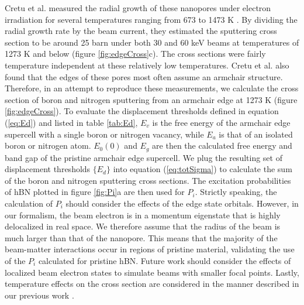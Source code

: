 \documentclass{article}
\begin{document}
Cretu et al. measured the radial growth of these nanopores under electron
irradiation for several temperatures ranging from 673 to 1473 K
\cite{Cretu2015}.
By dividing the radial growth rate by the beam current, they estimated the
sputtering cross section to be around 25 barn under both 30 and 60 keV beams at
temperatures of 1273 K and below (figure \ref{fig:edgeCross}c).
The cross sections were fairly temperature independent at these relatively low
temperatures.
Cretu et al. also found that the edges of these pores most often assume an
armchair structure.
Therefore, in an attempt to reproduce these measurements, we calculate the
cross section of boron and nitrogen sputtering from an armchair edge at 1273 K
(figure \ref{fig:edgeCross}).
To evaluate the displacement thresholds defined in equation (\ref{eq:Ed}) and
listed in table \ref{tab:Ed}, $E_v$ is the free energy of the armchair edge
supercell with a single boron or nitrogen vacancy, while $E_a$ is that of an
isolated boron or nitrogen atom.
$E_0(0)$ and $E_g$ are then the calculated free energy and band gap of the
pristine armchair edge supercell.
We plug the resulting set of displacement thresholds $\{E_d\}$ into equation
(\ref{eq:totSigma}) to calculate the sum of the boron and nitrogen sputtering
cross sections.
The excitation probabilities of hBN plotted in figure \ref{fig:Pi}a are
then used for $P_i$.
Strictly speaking, the calculation of $P_i$ should consider the effects of the
edge state orbitals.
However, in our formalism, the beam electron is in a momentum eigenstate that
is highly delocalized in real space.
We therefore assume that the radius of the beam is much larger than that of the
nanopore.
This means that the majority of the beam-matter interactions occur in regions
of pristine material, validating the use of the $P_i$ calculated for pristine
hBN.
Future work should consider the effects of localized beam electron states to
simulate beams with smaller focal points.
Lastly, temperature effects on the cross section are considered in the manner
described in our previous work \cite{Yoshimura2018}.
\end{document}

